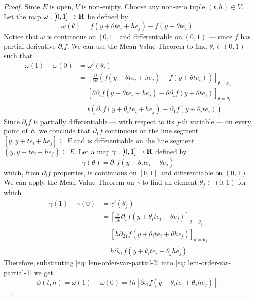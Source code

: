 \begin{proof}
  Since \(E\) is open, \(V\) is non-empty. Choose any non-zero tuple \((t, h)
  \in V\). Let the map \(\omega: [0, 1] \to \mathbf{R}\) be defined by
  \[
    \omega(\theta) = f(y + \theta t e_i + h e_j) - f(y + \theta t e_i).
  \]
  Notice that \(\omega\) is continuous on \([0, 1]\) and differentiable on \((0,
  1)\) --- since \(f\) has partial derivative \(\partial_i f\). We can use the
  Mean Value Theorem to find \(\theta_i \in (0, 1)\) such that
  \begin{align}\label{eq: lem-order-var-partial-1}
    \nonumber
    \omega(1) - \omega(0)
    &= \omega'(\theta_i)
    \\
    \nonumber
    &= \left[ \frac{\partial}{\partial \theta} \left(
      f(y + \theta t e_i + h e_j) - f(y + \theta t e_i)
    \right) \right]_{\theta = x_1}
    \\
    &= \left[
      \theta \partial_i f(y + \theta t e_i + h e_j)
      - \theta \partial_i f(y + \theta t e_i)
    \right]_{\theta = \theta_1}
    \\
    &= t (\partial_1 f(y + \theta_i t e_i + h e_j)
    - \partial_1 f(y + \theta_i t e_i))
  \end{align}
  Since \(\partial_i f\) is partially differentiable --- with respect to its
  \(j\)-th variable --- on every point of \(E\), we conclude that \(\partial_1
  f\) continuous on the line segment \([y, y + t e_i + h e_j] \subseteq E\) and
  is differentiable on the line segment \((y, y + t e_i + h e_j) \subseteq E\).
  Let a map \(\gamma: [0, 1] \to \mathbf{R}\) defined by
  \[
    \gamma(\theta) = \partial_1 f(y + \theta_i t e_i + \theta e_j)
  \]
  which, from \(\partial_i f\) properties, is continuous on \([0, 1]\) and
  differentiable on \((0, 1)\). We can apply the Mean Value Theorem on
  \(\gamma\) to find an element \(\theta_j \in (0, 1)\) for which
  \begin{align}\label{eq: lem-order-var-partial-2}
    \nonumber
    \gamma(1) - \gamma(0)
    &= \gamma'(\theta_j)
    \\ \nonumber
    &= \left[
      \frac{\partial}{\partial \theta}
      \partial_1 f(y + \theta_i t e_i + \theta e_j)
    \right]_{\theta = \theta_j}
    \\ \nonumber
    &= \left[
      h \partial_{21} f(y + \theta_i t e_i + \theta h e_j)
    \right]_{\theta = \theta_j}
    \\
    &= h \partial_{2 1} f(y + \theta_i t e_i + \theta_j h e_j)
  \end{align}
  Therefore, substituting \cref{eq: lem-order-var-partial-2} into \cref{eq:
  lem-order-var-partial-1} we get
  \[
    \phi(t, h) = \omega(1) - \omega(0)
    = t h [\partial_{2 1} f(y + \theta_i t e_i + \theta_j h e_j)].
  \]
\end{proof}

